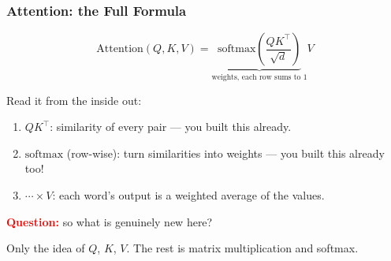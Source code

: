 \begin{frame}
    \frametitle{Attention: the Full Formula}

    \begin{definition}[Attention]
        \[
            \mathrm{Attention}(Q, K, V) = \underbrace{\mathrm{softmax}\!\left(\frac{Q K^\top}{\sqrt{d}}\right)}_{\text{weights, each row sums to } 1} V
        \]
    \end{definition}

    \pause

    Read it from the inside out:
    \begin{enumerate}
        \item $QK^\top$: similarity of every pair --- you built this already.
        \item $\mathrm{softmax}$ (row-wise): turn similarities into weights --- you built this already too!
        \item $\cdots \times V$: each word's output is a \alert{weighted average of the values}.
    \end{enumerate}

    \pause

    \textcolor{red}{\textbf{Question:}} so what is genuinely new here?

    \pause

    Only the idea of $Q$, $K$, $V$. The rest is matrix multiplication and softmax.
\end{frame}

